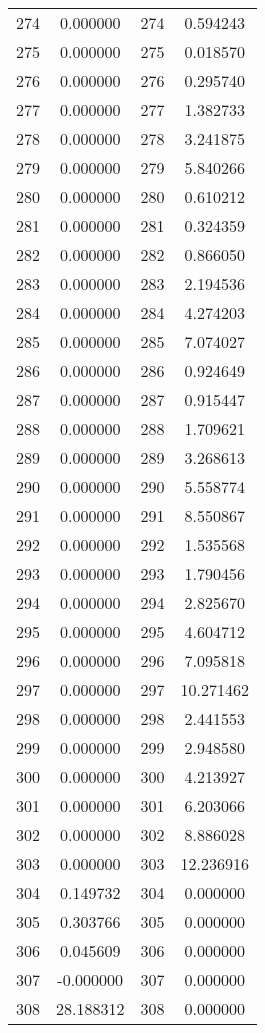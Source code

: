 \documentclass[12pt]{article}
\begin{document}
\begin{longtable}{@{}cccc@{}}
274 & 0.000000 & 274 & 0.594243 \\
275 & 0.000000 & 275 & 0.018570 \\
276 & 0.000000 & 276 & 0.295740 \\
277 & 0.000000 & 277 & 1.382733 \\
278 & 0.000000 & 278 & 3.241875 \\
279 & 0.000000 & 279 & 5.840266 \\
280 & 0.000000 & 280 & 0.610212 \\
281 & 0.000000 & 281 & 0.324359 \\
282 & 0.000000 & 282 & 0.866050 \\
283 & 0.000000 & 283 & 2.194536 \\
284 & 0.000000 & 284 & 4.274203 \\
285 & 0.000000 & 285 & 7.074027 \\
286 & 0.000000 & 286 & 0.924649 \\
287 & 0.000000 & 287 & 0.915447 \\
288 & 0.000000 & 288 & 1.709621 \\
289 & 0.000000 & 289 & 3.268613 \\
290 & 0.000000 & 290 & 5.558774 \\
291 & 0.000000 & 291 & 8.550867 \\
292 & 0.000000 & 292 & 1.535568 \\
293 & 0.000000 & 293 & 1.790456 \\
294 & 0.000000 & 294 & 2.825670 \\
295 & 0.000000 & 295 & 4.604712 \\
296 & 0.000000 & 296 & 7.095818 \\
297 & 0.000000 & 297 & 10.271462 \\
298 & 0.000000 & 298 & 2.441553 \\
299 & 0.000000 & 299 & 2.948580 \\
300 & 0.000000 & 300 & 4.213927 \\
301 & 0.000000 & 301 & 6.203066 \\
302 & 0.000000 & 302 & 8.886028 \\
303 & 0.000000 & 303 & 12.236916 \\
304 & 0.149732 & 304 & 0.000000 \\
305 & 0.303766 & 305 & 0.000000 \\
306 & 0.045609 & 306 & 0.000000 \\
307 & -0.000000 & 307 & 0.000000 \\
308 & 28.188312 & 308 & 0.000000 \\

\end{longtable}
\end{document}
